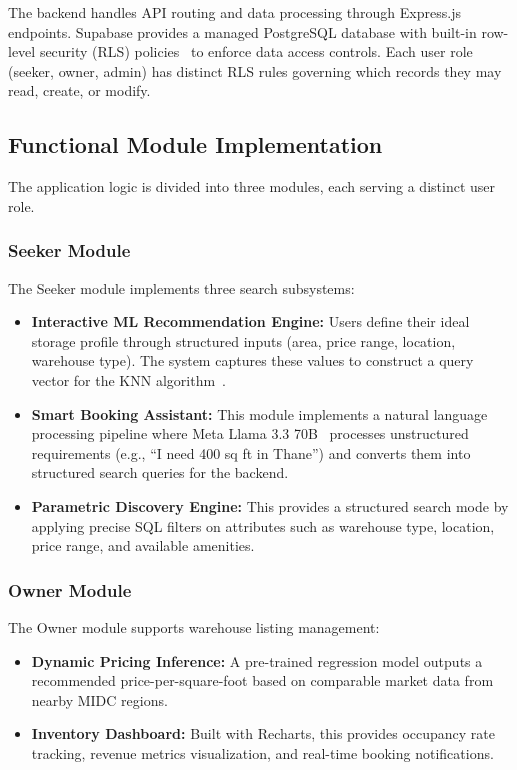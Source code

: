 \documentclass[pdflatex,sn-mathphys-num]{sn-jnl}
\theoremstyle{thmstyleone}
\theoremstyle{thmstyletwo}
\theoremstyle{thmstylethree}
\begin{document}
The backend handles API routing and data processing through Express.js endpoints. Supabase provides a managed PostgreSQL database with built-in row-level security (RLS) policies~\cite{b8} to enforce data access controls. Each user role (seeker, owner, admin) has distinct RLS rules governing which records they may read, create, or modify.

\subsection{Functional Module Implementation}\label{subsec:modules}

The application logic is divided into three modules, each serving a distinct user role.

\subsubsection{Seeker Module}\label{subsubsec:seeker}

The Seeker module implements three search subsystems:

\begin{itemize}
    \item \textbf{Interactive ML Recommendation Engine:} Users define their ideal storage profile through structured inputs (area, price range, location, warehouse type). The system captures these values to construct a query vector for the KNN algorithm~\cite{b11}.

    \item \textbf{Smart Booking Assistant:} This module implements a natural language processing pipeline where Meta Llama 3.3 70B~\cite{b13} processes unstructured requirements (e.g., ``I need 400 sq ft in Thane'') and converts them into structured search queries for the backend.

    \item \textbf{Parametric Discovery Engine:} This provides a structured search mode by applying precise SQL filters on attributes such as warehouse type, location, price range, and available amenities.
\end{itemize}

\subsubsection{Owner Module}\label{subsubsec:owner}

The Owner module supports warehouse listing management:

\begin{itemize}
    \item \textbf{Dynamic Pricing Inference:} A pre-trained regression model outputs a recommended price-per-square-foot based on comparable market data from nearby MIDC regions.

    \item \textbf{Inventory Dashboard:} Built with Recharts, this provides occupancy rate tracking, revenue metrics visualization, and real-time booking notifications.
\end{itemize}
\end{document}
